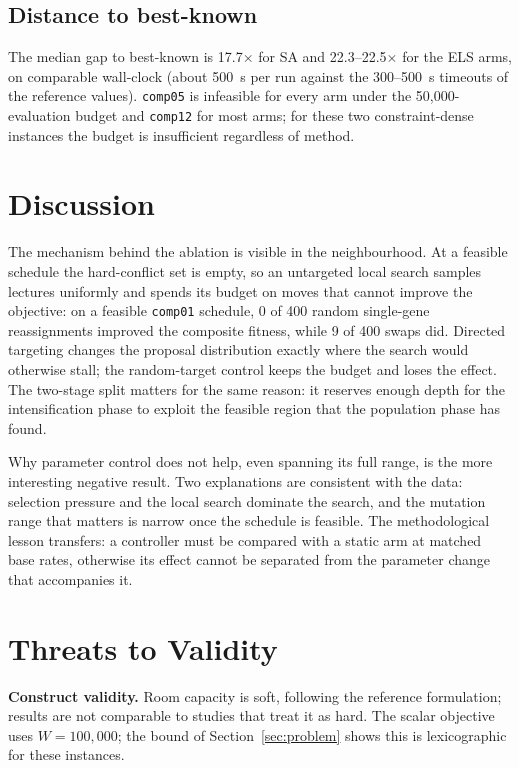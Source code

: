 \documentclass[journal]{IEEEtran}
\newcommand{\code}[1]{\texttt{#1}}
\begin{document}
\subsection{Distance to best-known}
The median gap to best-known is 17.7$\times$ for SA and 22.3--22.5$\times$ for the ELS arms, on comparable wall-clock (about 500~s per run against the 300--500~s timeouts of the reference values). \code{comp05} is infeasible for every arm under the 50{,}000-evaluation budget and \code{comp12} for most arms; for these two constraint-dense instances the budget is insufficient regardless of method.

\section{Discussion}
The mechanism behind the ablation is visible in the neighbourhood. At a feasible schedule the hard-conflict set is empty, so an untargeted local search samples lectures uniformly and spends its budget on moves that cannot improve the objective: on a feasible \code{comp01} schedule, 0 of 400 random single-gene reassignments improved the composite fitness, while 9 of 400 swaps did. Directed targeting changes the proposal distribution exactly where the search would otherwise stall; the random-target control keeps the budget and loses the effect. The two-stage split matters for the same reason: it reserves enough depth for the intensification phase to exploit the feasible region that the population phase has found.

Why parameter control does not help, even spanning its full range, is the more interesting negative result. Two explanations are consistent with the data: selection pressure and the local search dominate the search, and the mutation range that matters is narrow once the schedule is feasible. The methodological lesson transfers: a controller must be compared with a static arm at matched base rates, otherwise its effect cannot be separated from the parameter change that accompanies it.

\section{Threats to Validity}
\textbf{Construct validity.} Room capacity is soft, following the reference formulation; results are not comparable to studies that treat it as hard. The scalar objective uses $W=100{,}000$; the bound of Section~\ref{sec:problem} shows this is lexicographic for these instances.
\end{document}
